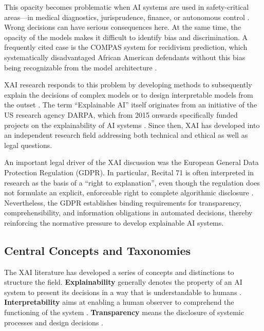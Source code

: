 \documentclass[
  12pt,
  a4paper,
  oneside,
  titlepage
]{article}
\begin{document}
This opacity becomes problematic when AI systems are used in safety-critical areas—in 
medical diagnostics, jurisprudence, finance, or autonomous control 
\citep[ p.~80800]{Ortigossa2024}. Wrong decisions can have serious consequences here. 
At the same time, the opacity of the models makes it difficult to identify bias and 
discrimination. A frequently cited case is the COMPAS system for recidivism prediction, 
which systematically disadvantaged African American defendants without this bias being 
recognizable from the model architecture \citep[ p.~84]{BarredoArrieta2020}.

XAI research responds to this problem by developing methods to subsequently explain 
the decisions of complex models or to design interpretable models from the outset 
\citep{Mersha2024}. The term \enquote{Explainable AI} itself originates from an 
initiative of the US research agency DARPA, which from 2015 onwards specifically 
funded projects on the explainability of AI systems \citep[ p.~86]{BarredoArrieta2020}. 
Since then, XAI has developed into an independent research field addressing both 
technical and ethical as well as legal questions.

An important legal driver of the XAI discussion was the European General Data Protection 
Regulation (GDPR). In particular, Recital 71 is often interpreted in research as the 
basis of a \enquote{right to explanation}, even though the regulation does not formulate 
an explicit, enforceable right to complete algorithmic disclosure \citep{Wachter2017}. 
Nevertheless, the GDPR establishes binding requirements for transparency, 
comprehensibility, and information obligations in automated decisions, thereby 
reinforcing the normative pressure to develop explainable AI systems.

\subsection{Central Concepts and Taxonomies}

The XAI literature has developed a series of concepts and distinctions to structure 
the field. \textbf{Explainability} generally denotes the property of an AI system to 
present its decisions in a way that is understandable to humans 
\citep[ p.~89]{BarredoArrieta2020}. \textbf{Interpretability} aims at enabling a 
human observer to comprehend the functioning of the system \citep[ p.~25]{Weller2019}. 
\textbf{Transparency} means the disclosure of systemic processes and design decisions 
\citep[ p.~27]{Weller2019}.
\end{document}
